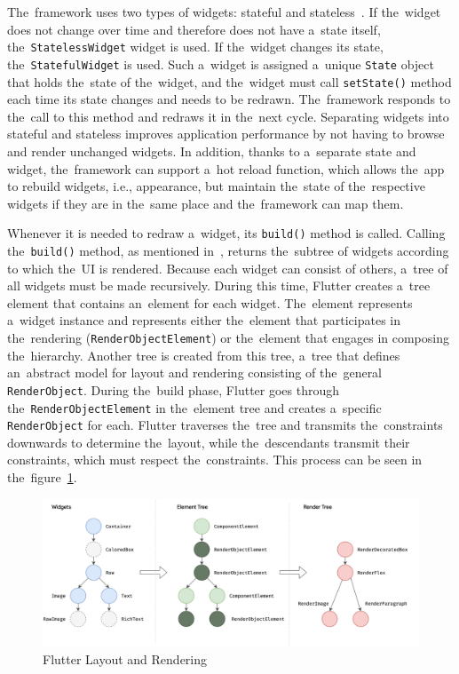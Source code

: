 The~framework uses two types of widgets: stateful and stateless~\cite{a2022_flutter_architecture}.
If the~widget does not change over time and therefore does not have a~state itself, the~\texttt{StatelessWidget} widget is used.
If the~widget changes its state, the~\texttt{StatefulWidget} is used.
Such a~widget is assigned a~unique \texttt{State} object that holds the~state of the~widget, and the~widget must call \texttt{setState()} method each time its state changes and needs to be redrawn.
The~framework responds to the~call to this method and redraws it in the~next cycle.
Separating widgets into stateful and stateless improves application performance by not having to browse and render unchanged widgets.
In addition, thanks to a~separate state and widget, the~framework can support a~hot reload function, which allows the~app to rebuild widgets, i.e., appearance, but maintain the~state of the~respective widgets if they are in the~same place and the~framework can map them.

Whenever it is needed to redraw a~widget, its \texttt{build()} method is called.
Calling the~\texttt{build()} method, as mentioned in~\cite{a2022_flutter_architecture}, returns the~subtree of widgets according to which the~UI is rendered.
Because each widget can consist of others, a~tree of all widgets must be made recursively.
During this time, Flutter creates a~tree element that contains an~element for each widget.
The~element represents a~widget instance and represents either the~element that participates in the~rendering (\texttt{RenderObjectElement}) or the~element that engages in composing the~hierarchy.
Another tree is created from this tree, a~tree that defines an~abstract model for layout and rendering consisting of the~general \texttt{RenderObject}.
During the~build phase, Flutter goes through the~\texttt{RenderObjectElement} in the~element tree and creates a~specific \texttt{RenderObject} for each.
Flutter traverses the~tree and transmits the~constraints downwards to determine the~layout, while the~descendants transmit their constraints, which must respect the~constraints.
This process can be seen in the~figure~\ref{fig:design:fluttertrees}.

\begin{figure}
    \centering
    \includegraphics[width=1\linewidth]{assets/design/fluttertrees.png}
    \caption{Flutter Layout and Rendering~\cite{a2022_flutter_architecture}}
    \label{fig:design:fluttertrees}
\end{figure}

